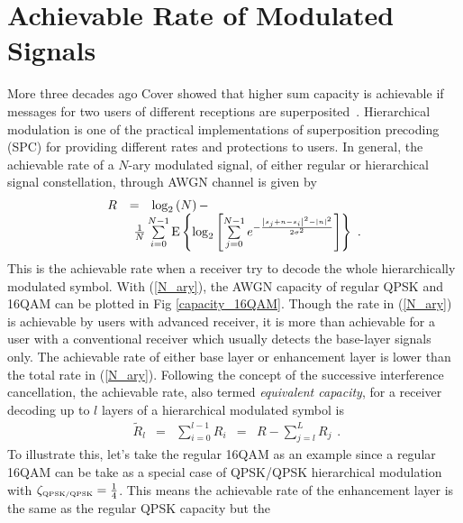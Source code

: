 \documentclass[10pt,fleqn, twocolumn]{IEEEtran}
\begin{document}
\section{Achievable Rate of Modulated Signals~\label{Info_Theory}}
More three decades ago Cover showed that higher sum capacity is
achievable if messages for two users of different receptions are
superposited~\cite{Cover72}. Hierarchical modulation is one of the
practical implementations of superposition precoding (SPC) for
providing different rates and protections to users. In general,
the achievable rate of a $N$-ary modulated signal, of either
regular or hierarchical signal constellation, through AWGN channel
is given by~\cite{Unge82}
\begin{equation}
\begin{array}{lcl}
R&=&\log_{2}\left(N\right)-\\
&&\hspace{-0.20in}\frac{1}{N}\sum\limits_{i=0}^{N-1}\mbox{E}\left\{\log_{2}\left[\sum\limits_{j=0}^{N-1}e^{-\frac{\left|s_{j}+n-s_{i}\right|^2-\left|n\right|^2}{2\sigma^2}}\right]\right\}\
.
\end{array}\label{N_ary}
\end{equation}
\noindent This is the achievable rate when a receiver try to
decode the whole hierarchically modulated symbol. With
(\ref{N_ary}), the AWGN capacity of regular QPSK and 16QAM can be
plotted in Fig \ref{capacity_16QAM}. Though the rate in
(\ref{N_ary}) is achievable by users with advanced receiver, it is
more than achievable for a user with a conventional receiver which
usually detects the base-layer signals only. The achievable rate
of either base layer or enhancement layer is lower than the total
rate in (\ref{N_ary}). Following the concept of the successive
interference cancellation, the achievable rate, also termed {\em
equivalent capacity}, for a receiver decoding up to $l$ layers of
a hierarchical modulated symbol is~\cite{Huber94}
\begin{equation}
\begin{array}{rcccl}
\tilde{R}_{l}&=&\sum\limits_{i=0}^{l-1}R_{i}& = &
R-\sum\limits_{j=l}^{L}{R}_{j}
\end{array}.\label{R_equiv}
\end{equation}
\noindent To illustrate this, let's take the regular 16QAM as an
example since a regular 16QAM can be take as a special case of
QPSK/QPSK hierarchical modulation with $\zeta_{\mbox{\tiny
QPSK/QPSK}}=\frac{1}{4}$. This means the achievable rate of the
enhancement layer is the same as the regular QPSK capacity but the
\end{document}
